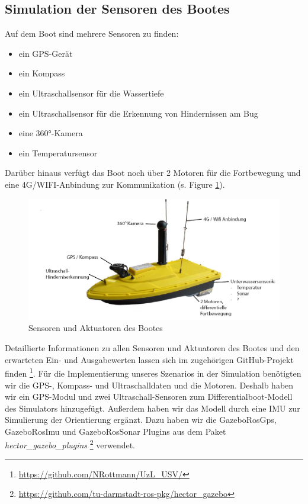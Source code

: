 \documentclass[conference]{IEEEtran}
\begin{document}
\subsection{Simulation der Sensoren des Bootes}
Auf dem Boot sind mehrere Sensoren zu finden:
\begin{itemize}
	\item ein GPS-Gerät
	\item ein Kompass
	\item ein Ultraschallsensor für die Wassertiefe
	\item ein Ultraschallsensor für die Erkennung von Hindernissen am Bug
	\item eine 360°-Kamera
	\item ein Temperatursensor
\end{itemize}
Darüber hinaus verfügt das Boot noch über 2 Motoren für die Fortbewegung und eine 4G/WIFI-Anbindung zur Kommunikation (s. Figure \ref{boot}).\\
\begin{figure}
	\includegraphics[width=\linewidth]{boot.png}
	\caption{Sensoren und Aktuatoren des Bootes}
	\label{boot}
\end{figure}
Detaillierte Informationen zu allen Sensoren und Aktuatoren des Bootes und den erwarteten Ein- und Ausgabewerten lassen sich im zugehörigen GitHub-Projekt finden \footnote{\url{https://github.com/NRottmann/UzL_USV/}}.
Für die Implementierung unseres Szenarios in der Simulation benötigten wir die GPS-, Kompass- und Ultraschalldaten und die Motoren. Deshalb haben wir ein GPS-Modul und zwei Ultraschall-Sensoren zum Differentialboot-Modell des Simulators hinzugefügt. Außerdem haben wir das Modell durch eine IMU zur Simulierung der Orientierung ergänzt. Dazu haben wir die GazeboRosGps, GazeboRosImu und GazeboRosSonar Plugins aus dem Paket \textit{hector\_gazebo\_plugins}  \footnote{\url{https://github.com/tu-darmstadt-ros-pkg/hector_gazebo}} verwendet.\\
\end{document}

